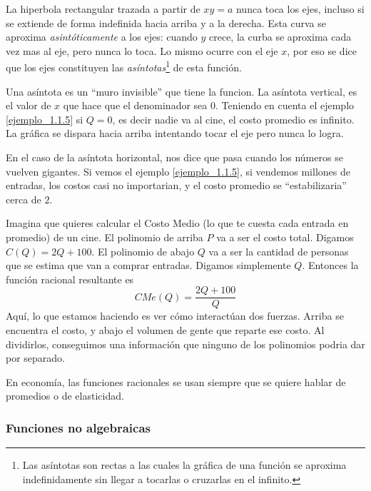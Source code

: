 La hiperbola rectangular trazada a partir de \(xy=a\) nunca toca los ejes, incluso si se extiende de forma indefinida hacia arriba y a la derecha. Esta curva se aproxima \textit{asintóticamente} a los ejes: cuando \(y\) crece, la curba se aproxima cada vez mas al eje, pero nunca lo toca. Lo mismo ocurre con el eje \(x\), por eso se dice que los ejes constituyen las \textit{asíntotas}\footnote{Las asíntotas son rectas a las cuales la gráfica de una función se aproxima indefinidamente sin llegar a tocarlas o cruzarlas en el infinito.} de esta función.

Una asíntota es un ``muro invisible'' que tiene la funcion. La asíntota vertical, es el valor de \(x\) que hace que el denominador sea \(0\). Teniendo en cuenta el ejemplo \ref{ejemplo_1.1.5} si \(Q=0\), es decir nadie va al cine, el costo promedio es infinito. La gráfica se dispara hacia arriba intentando tocar el eje pero nunca lo logra.

En el caso de la asíntota horizontal, nos dice que pasa cuando los números se vuelven gigantes. Si vemos el ejemplo \ref{ejemplo_1.1.5}, si vendemos millones de entradas, los costos casi no importarian, y el costo promedio se ``estabilizaria'' cerca de \(2\).

\begin{ejemplo}
    \label{ejemplo_1.1.5}
    Imagina que quieres calcular el Costo Medio (lo que te cuesta cada entrada en promedio) de un cine. El polinomio de arriba \(P\) va a ser el costo total. Digamos \(C(Q)=2Q+100\). El polinomio de abajo \(Q\) va a ser la cantidad de personas que se estima que van a comprar entradas. Digamos simplemente \(Q\).
    Entonces la función racional resultante es 
    \[
    CMe(Q) = \frac{2Q + 100}{Q}
    \]
    Aquí, lo que estamos haciendo es ver cómo interactúan dos fuerzas. Arriba se encuentra el costo, y abajo el volumen de gente que reparte ese costo. Al dividirlos, conseguimos una información que ninguno de los polinomios podria dar por separado.
\end{ejemplo}

\begin{nota}
    En economía, las funciones racionales se usan siempre que se quiere hablar de promedios o de elasticidad.
\end{nota}


\subsubsection{Funciones no algebraicas}

